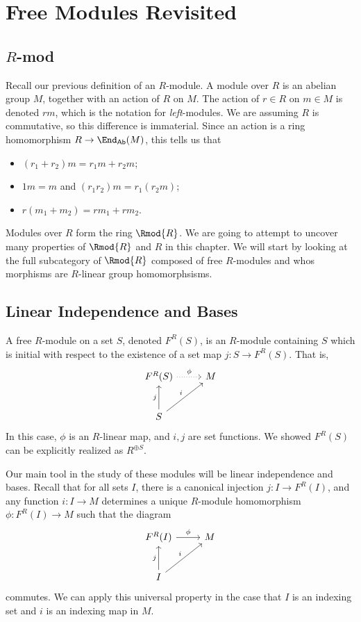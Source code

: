\section{Free Modules Revisited}
\subsection{$R$-mod}
Recall our previous definition of an $R$-module. A module over $R$ is an abelian group $M$, together with an action of $R$ on $M$. The action of $r\in R$ on $m\in M$ is denoted $r m$, which is the notation for \emph{left}-modules. We are assuming $R$ is commutative, so this difference is immaterial. Since an action is a ring homomorphism $R \to \End_{\mathsf{Ab} }(M) $, this tells us that
\begin{itemize}
	\item $(r_1+r_2)m=r_1m+r_2m$;
	\item $1m=m$ and $(r_1r_2)m=r_1(r_2m)$;
	\item $r(m_1+m_2)=r m_1+r m_2$.
\end{itemize}

Modules over $R$ form the ring $\Rmod{R}$. We are going to attempt to uncover many properties of $\Rmod{R} $ and $R$ in this chapter. We will start by looking at the full subcategory of $\Rmod{R} $ composed of free $R$-modules and whos morphisms are $R$-linear group homomorphsisms.

\subsection{Linear Independence and Bases}
A free $R$-module on a set $S$, denoted $F^R(S)$, is an $R$-module containing $S$ which is initial with respect to the existence of a set map $j : S \to F^R(S)$. That is,
\[\begin{tikzcd}[row sep = 2.5em, column sep = 2.5em]
	F^R(S)\arrow[r, dotted, "\phi "]&M\\
	S\arrow[u, "j"]\arrow[ru, "i"]
\end{tikzcd}\]
In this case, $\phi $ is an $R$-linear map, and $i,j$ are set functions. We showed $F^R(S)$ can be explicitly realized as $R^{\oplus S} $.

Our main tool in the study of these modules will be linear independence and bases. Recall that for all sets $I$, there is a canonical injection $j : I \to F^R(I)$, and any function $i : I \to M$ determines a unique $R$-module homomorphism $\phi : F^R(I) \to M$ such that the diagram
\[\begin{tikzcd}[row sep = 2.5em, column sep = 2.5em]
	F^R(I)\arrow[r, "\phi "]&M\\
	I\arrow[u, "j"]\arrow[ru, "i"]
\end{tikzcd}\]
commutes. We can apply this universal property in the case that $I$ is an indexing set and $i$ is an indexing map in $M$.

